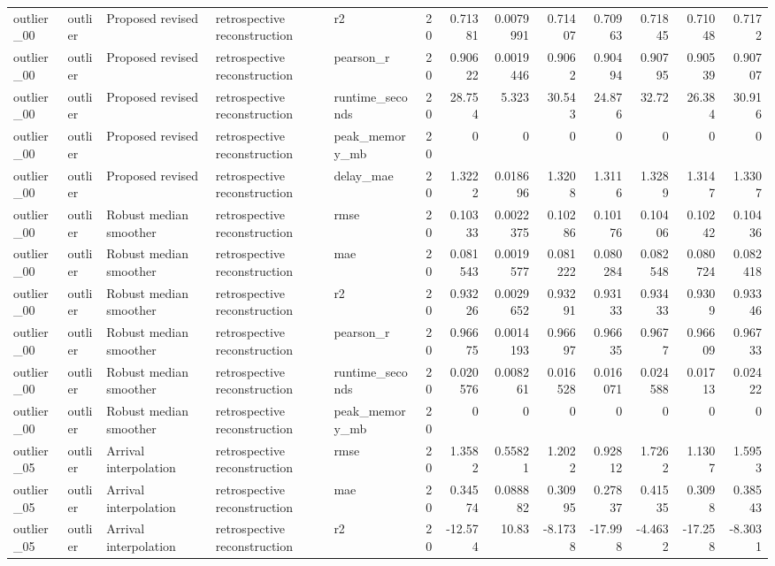 \begin{table}[!htbp]
{{\begin{tabular}{lllllrrrrrrrr}
outlier_00 & outlier & Proposed revised & retrospective reconstruction & r2 & 20 & 0.71381 & 0.0079991 & 0.71407 & 0.70963 & 0.71845 & 0.71048 & 0.7172 \\
outlier_00 & outlier & Proposed revised & retrospective reconstruction & pearson_r & 20 & 0.90622 & 0.0019446 & 0.9062 & 0.90494 & 0.90795 & 0.90539 & 0.90707 \\
outlier_00 & outlier & Proposed revised & retrospective reconstruction & runtime_seconds & 20 & 28.754 & 5.323 & 30.543 & 24.876 & 32.72 & 26.384 & 30.916 \\
outlier_00 & outlier & Proposed revised & retrospective reconstruction & peak_memory_mb & 20 & 0 & 0 & 0 & 0 & 0 & 0 & 0 \\
outlier_00 & outlier & Proposed revised & retrospective reconstruction & delay_mae & 20 & 1.3222 & 0.018696 & 1.3208 & 1.3116 & 1.3289 & 1.3147 & 1.3307 \\
outlier_00 & outlier & Robust median smoother & retrospective reconstruction & rmse & 20 & 0.10333 & 0.0022375 & 0.10286 & 0.10176 & 0.10406 & 0.10242 & 0.10436 \\
outlier_00 & outlier & Robust median smoother & retrospective reconstruction & mae & 20 & 0.081543 & 0.0019577 & 0.081222 & 0.080284 & 0.082548 & 0.080724 & 0.082418 \\
outlier_00 & outlier & Robust median smoother & retrospective reconstruction & r2 & 20 & 0.93226 & 0.0029652 & 0.93291 & 0.93133 & 0.93433 & 0.9309 & 0.93346 \\
outlier_00 & outlier & Robust median smoother & retrospective reconstruction & pearson_r & 20 & 0.96675 & 0.0014193 & 0.96697 & 0.96635 & 0.9677 & 0.96609 & 0.96733 \\
outlier_00 & outlier & Robust median smoother & retrospective reconstruction & runtime_seconds & 20 & 0.020576 & 0.008261 & 0.016528 & 0.016071 & 0.024588 & 0.01713 & 0.02422 \\
outlier_00 & outlier & Robust median smoother & retrospective reconstruction & peak_memory_mb & 20 & 0 & 0 & 0 & 0 & 0 & 0 & 0 \\
outlier_05 & outlier & Arrival interpolation & retrospective reconstruction & rmse & 20 & 1.3582 & 0.55821 & 1.2022 & 0.92812 & 1.7262 & 1.1307 & 1.5953 \\
outlier_05 & outlier & Arrival interpolation & retrospective reconstruction & mae & 20 & 0.34574 & 0.088882 & 0.30995 & 0.27837 & 0.41535 & 0.3098 & 0.38543 \\
outlier_05 & outlier & Arrival interpolation & retrospective reconstruction & r2 & 20 & -12.574 & 10.83 & -8.1738 & -17.998 & -4.4632 & -17.258 & -8.3031 \\

\end{tabular}}}
\end{table}
